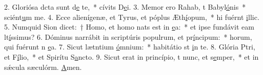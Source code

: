 2. Gloriósa dcta sunt d\uline{e} te,~* cívits D\uline{e}i.
3. Memor ero Rahab, t Babyl\uline{ó}nis~* sciént\uline{u}m me.
4. Ecce alienígenæ, et Tyrus, et póplus Æth\uline{í}opum,~* hi fuérnt \uline{i}llic.
5. Numquid Sion dicet:~† Homo, et homo nats est in \uline{e}a:~* et ipse fundávit eam lt\uline{í}ssimus?
6. Dóminus narrábit in scriptúris populrum, et pr\uline{í}ncipum:~* horum, qui fuérunt n \uline{e}a.
7. Sicut lætntium \uline{ó}mnium:~* habitátio st \uline{i}n te.
8. Glória Ptri, et F\uline{í}lio,~* et Spirítu S\uline{a}ncto.
9. Sicut erat in princípio, t nunc, et s\uline{e}mper,~* et in sǽcula sæculórm. \uline{A}men.
